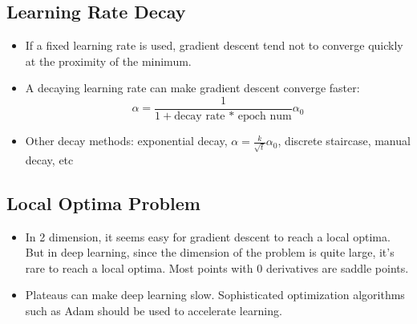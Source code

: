 \subsection{Learning Rate Decay}
\begin{itemize}
  \item If a fixed learning rate is used, gradient descent tend not to converge quickly at the proximity of the minimum.
  \item A decaying learning rate can make gradient descent converge faster:
  \[\alpha=\frac{1}{1+\text{decay rate * epoch num}}\alpha_0\]
  \item Other decay methods: exponential decay, $\alpha=\frac{k}{\sqrt{t}}\alpha_0$, discrete staircase, manual decay, etc
\end{itemize}
\subsection{Local Optima Problem}
\begin{itemize}
  \item In 2 dimension, it seems easy for gradient descent to reach a local optima. But in deep learning, since the dimension of the problem is quite large, it's rare to reach a local optima. Most points with 0 derivatives are saddle points.
  \item Plateaus can make deep learning slow. Sophisticated optimization algorithms such as Adam should be used to accelerate learning.
\end{itemize}
